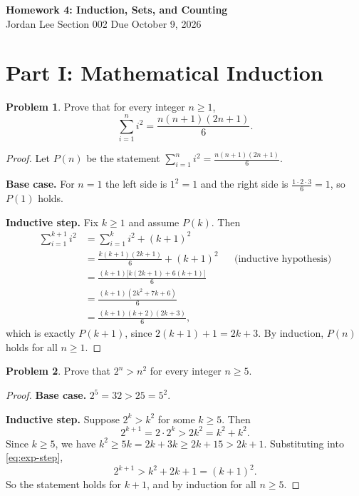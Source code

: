 \documentclass[11pt]{article}
\theoremstyle{definition}
\newtheorem{problem}{Problem}
\begin{document}
\begin{center}
  {\Large\bfseries Homework 4: Induction, Sets, and Counting}\\[4pt]
  Jordan Lee \quad\textbullet\quad Section 002 \quad\textbullet\quad Due October 9, 2026
\end{center}

\section*{Part I: Mathematical Induction}

\begin{problem}\label{prob:squares}
Prove that for every integer $n \geq 1$,
\[
  \sum_{i=1}^{n} i^2 = \frac{n(n+1)(2n+1)}{6}.
\]
\end{problem}

\begin{proof}
Let $P(n)$ be the statement $\sum_{i=1}^{n} i^2 = \frac{n(n+1)(2n+1)}{6}$.

\textbf{Base case.} For $n = 1$ the left side is $1^2 = 1$ and the right side is $\frac{1 \cdot 2 \cdot 3}{6} = 1$, so $P(1)$ holds.

\textbf{Inductive step.} Fix $k \geq 1$ and assume $P(k)$. Then
\begin{align*}
  \sum_{i=1}^{k+1} i^2
    &= \sum_{i=1}^{k} i^2 + (k+1)^2 \\
    &= \frac{k(k+1)(2k+1)}{6} + (k+1)^2 && \text{(inductive hypothesis)} \\
    &= \frac{(k+1)\bigl[k(2k+1) + 6(k+1)\bigr]}{6} \\
    &= \frac{(k+1)(2k^2 + 7k + 6)}{6} \\
    &= \frac{(k+1)(k+2)(2k+3)}{6},
\end{align*}
which is exactly $P(k+1)$, since $2(k+1)+1 = 2k+3$. By induction, $P(n)$ holds for all $n \geq 1$.
\end{proof}

\begin{problem}\label{prob:exp}
Prove that $2^n > n^2$ for every integer $n \geq 5$.
\end{problem}

\begin{proof}
\textbf{Base case.} $2^5 = 32 > 25 = 5^2$.

\textbf{Inductive step.} Suppose $2^k > k^2$ for some $k \geq 5$. Then
\begin{equation}\label{eq:exp-step}
  2^{k+1} = 2 \cdot 2^k > 2k^2 = k^2 + k^2.
\end{equation}
Since $k \geq 5$, we have $k^2 \geq 5k = 2k + 3k \geq 2k + 15 > 2k + 1$. Substituting into \eqref{eq:exp-step},
\[
  2^{k+1} > k^2 + 2k + 1 = (k+1)^2.
\]
So the statement holds for $k+1$, and by induction for all $n \geq 5$.
\end{proof}
\end{document}
